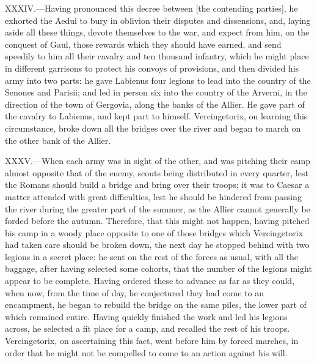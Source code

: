 XXXIV.—Having pronounced this decree between [the contending parties],
he exhorted the Aedui to bury in oblivion their disputes and
dissensions, and, laying aside all these things, devote themselves to
the war, and expect from him, on the conquest of Gaul, those rewards
which they should have earned, and send speedily to him all their
cavalry and ten thousand infantry, which he might place in different
garrisons to protect his convoys of provisions, and then divided his
army into two parts: he gave Labienus four legions to lead into the
country of the Senones and Parisii; and led in person six into the
country of the Arverni, in the direction of the town of Gergovia, along
the banks of the Allier. He gave part of the cavalry to Labienus, and
kept part to himself. Vercingetorix, on learning this circumstance,
broke down all the bridges over the river and began to march on the
other bank of the Allier.

XXXV.—When each army was in sight of the other, and was pitching their
camp almost opposite that of the enemy, scouts being distributed in
every quarter, lest the Romans should build a bridge and bring over
their troops; it was to Caesar a matter attended with great
difficulties, lest he should be hindered from passing the river during
the greater part of the summer, as the Allier cannot generally be forded
before the autumn. Therefore, that this might not happen, having pitched
his camp in a woody place opposite to one of those bridges which
Vercingetorix had taken care should be broken down, the next day he
stopped behind with two legions in a secret place: he sent on the rest
of the forces as usual, with all the baggage, after having selected some
cohorts, that the number of the legions might appear to be complete.
Having ordered these to advance as far as they could, when now, from the
time of day, he conjectured they had come to an encampment, he began to
rebuild the bridge on the same piles, the lower part of which remained
entire. Having quickly finished the work and led his legions across, he
selected a fit place for a camp, and recalled the rest of his troops.
Vercingetorix, on ascertaining this fact, went before him by forced
marches, in order that he might not be compelled to come to an action
against his will.

